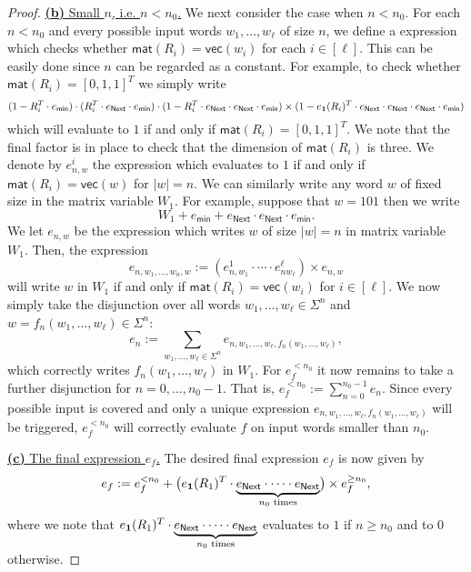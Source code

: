 \begin{proof}
\medskip
\noindent
\underline{\textbf{(b)} Small $n$, i.e. $n< n_0$.}	
We next consider the case when $n<n_0$. For each $n<n_0$ and every possible input words
    $w_1,\ldots,w_\ell$ of size $n$, we define a \langfor expression which checks whether
    $\mathsf{mat}(R_i)=\mathsf{vec}(w_i)$ for each $i\in[\ell]$. This can be easily done since $n$ 
    can be regarded as a constant. For example, to check whether $\mathsf{mat}(R_i)=[0,1,1]^T$ we simply write
    $$
    (1- R_i^T\cdot e_{\mathsf{min}})\cdot (R_i^T\cdot e_{\mathsf{Next}}\cdot e_{\mathsf{min}})\cdot (1- R_i^T\cdot e_{\mathsf{Next}}\cdot e_{\mathsf{Next}}\cdot e_{\mathsf{min}})\times (1- e_{\mathbf{1}}(R_i)^T\cdot e_{\mathsf{Next}}\cdot e_{\mathsf{Next}}\cdot e_{\mathsf{Next}}\cdot e_{\mathsf{min}})
    $$
    which will evaluate to $1$ if and only if $\mathsf{mat}(R_i)=[0,1,1]^T$. We note that the final factor is in 
    place to check that the dimension of $\mathsf{mat}(R_i)$ is three.
    We denote by
    $e_{n,w}^i$ the expression which evaluates to $1$ if and only if $\mathsf{mat}(R_i)=\mathsf{vec}(w)$
    for $|w|=n$.
    We can similarly
    write any word $w$ of fixed size in the matrix variable $W_1$. For example, suppose that $w=101$
    then we write 
    $$
    W_1+ e_{\mathsf{min}}+  e_{\mathsf{Next}}\cdot e_{\mathsf{Next}}\cdot e_{\mathsf{min}}.
    $$
    We let $e_{n,w}$ be the expression which writes $w$ of size $|w|=n$ in matrix variable $W_1$.
    Then, the expression
    $$
    e_{n,w_1,\ldots,w_n,w}:=(e_{n,w_1}^1\cdot\cdots\cdot e_{nw_{\ell}}^\ell)\times e_{n,w}
    $$
    will write $w$ in $W_1$ if and only if $\mathsf{mat}(R_i)=\mathsf{vec}(w_i)$ for $i\in[\ell]$.
    We now simply take the disjunction over all words 
    $w_1,\ldots,w_\ell\in\Sigma^n$ and $w=f_n(w_1,\ldots,w_\ell)\in\Sigma^n$:
    $$
    e_n:=\sum_{w_1,\ldots,w_\ell\in\Sigma^n} e_{n,w_1,\ldots,w_\ell,f_n(w_1,\ldots,w_\ell)},
    $$
    which correctly writes $f_n(w_1,\ldots,w_\ell)$ in $W_1$. For $e_f^{<n_0}$ it now remains
to take a further disjunction for $n=0,\ldots, n_0-1$. That is,
    $
    e_f^{<n_0}:=\sum_{n=0}^{n_0-1} e_n
    $.
    Since every possible input is covered and only a unique expression 
    $e_{n,w_1,\ldots,w_\ell,f_n(w_1,\ldots,w_\ell)}$ will be triggered, $e_f^{<n_0}$ will correctly
    evaluate $f$ on input words smaller than $n_0$.

\medskip
\noindent
\underline{\textbf{(c)} The final expression $e_f$.}	
 The desired final expression $e_f$ is now given by
    $$
    e_f:=e_f^{<n_0} + \bigl(e_{\mathbf{1}}(R_1)^T\cdot\underbrace{e_{\mathsf{Next}}\cdot\cdots\cdot e_{\mathsf{Next}}}_{\text{$n_0$ times}}\bigr)\times e_f^{\geq n_0},
    $$
where we note that $e_{\mathbf{1}}(R_1)^T\cdot\underbrace{e_{\mathsf{Next}}\cdot\cdots\cdot e_{\mathsf{Next}}}_{\text{$n_0$ times}}$ evaluates to $1$ if
$n\geq n_0$ and to $0$ otherwise.
\end{proof}

